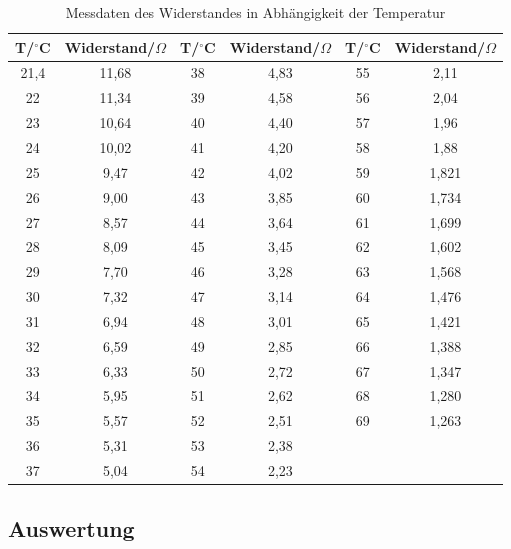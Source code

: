 \documentclass[12pt,a4paper]{article}
\begin{document}
\begin{table}[htbp]
\centering
\begin{tabular}{||c|c||c|c||c|c||}

T/$^\circ$C & Widerstand/$\Omega$ & T/$^\circ$C & Widerstand/$\Omega$ & T/$^\circ$C & Widerstand/$\Omega$ \\ \hline
21,4 & 11,68 & 38 & 4,83 & 55 & 2,11 \\ 
22 & 11,34 & 39 & 4,58 & 56 & 2,04 \\ 
23 & 10,64 & 40 & 4,40 & 57 & 1,96 \\ 
24 & 10,02 & 41 & 4,20 & 58 & 1,88 \\ 
25 & 9,47 & 42 & 4,02 & 59 & 1,821 \\ 
26 & 9,00 & 43 & 3,85 & 60 & 1,734 \\ 
27 & 8,57 & 44 & 3,64 & 61 & 1,699 \\ 
28 & 8,09 & 45 & 3,45 & 62 & 1,602 \\ 
29 & 7,70 & 46 & 3,28 & 63 & 1,568 \\ 
30 & 7,32 & 47 & 3,14 & 64 & 1,476 \\ 
31 & 6,94 & 48 & 3,01 & 65 & 1,421 \\ 
32 & 6,59 & 49 & 2,85 & 66 & 1,388 \\ 
33 & 6,33 & 50 & 2,72 & 67 & 1,347 \\ 
34 & 5,95 & 51 & 2,62 & 68 & 1,280 \\ 
35 & 5,57 & 52 & 2,51 & 69 & 1,263 \\ 
36 & 5,31 & 53 & 2,38 & \multicolumn{1}{l}{} & \multicolumn{1}{l}{} \\ 
37 & 5,04 & 54 & 2,23 & \multicolumn{1}{l}{} & \multicolumn{1}{l}{} \\ 
\end{tabular}
\caption{Messdaten des Widerstandes in Abhängigkeit der Temperatur}
\label{tab:1}
\end{table}





\subsection{Auswertung}
\end{document}
